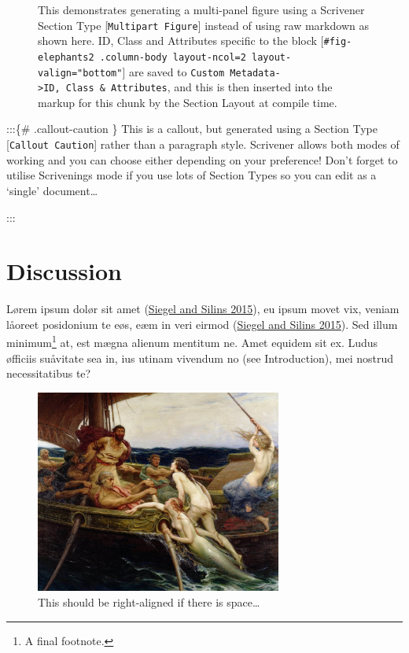 \documentclass[
  12pt,
  a4paper,
  oneside,
  titlepage,
  toclink=all,
  toc=bibliography]{scrbook}
\theoremstyle{plain}
\theoremstyle{plain}
\theoremstyle{definition}
\theoremstyle{definition}
\theoremstyle{plain}
\theoremstyle{plain}
\theoremstyle{plain}
\theoremstyle{definition}
\theoremstyle{remark}
\begin{document}
\begin{figure}
\begin{minipage}[b]{0.56\linewidth}
{}

\end{minipage}%

\caption{\label{fig-scriv171}This demonstrates generating a multi-panel
figure using a Scrivener Section Type {[}\texttt{Multipart\ Figure}{]}
instead of using raw markdown as shown here. ID, Class and Attributes
specific to the block
{[}\texttt{\#fig-elephants2\ .column-body\ layout-ncol=2\ layout-valign="bottom"}{]}
are saved to
\texttt{Custom\ Metadata-\textgreater{}ID,\ Class\ \&\ Attributes}, and
this is then inserted into the markup for this chunk by the Section
Layout at compile time.}

\end{figure}

:::\{\# .callout-caution \} This is a callout, but generated using a
Section Type {[}\texttt{Callout\ Caution}{]} rather than a paragraph
style. Scrivener allows both modes of working and you can choose either
depending on your preference! Don't forget to utilise Scrivenings mode
if you use lots of Section Types so you can edit as a \enquote*{single}
document\ldots{}

:::

\newpage{}

\newpage{}

\hypertarget{sec-scriv173}{%
\chapter{Discussion}\label{sec-scriv173}}

Lørem ipsum dolør sit amet
\protect\hypertarget{cite_33}{}{\label{cite_33}(\protect\hyperlink{ref-siegel2015}{Siegel
and Silins 2015})}, eu ipsum movet vix, veniam låoreet posidonium te
eøs, eæm in veri eirmod
\protect\hypertarget{cite_34}{}{\label{cite_34}(\protect\hyperlink{ref-siegel2015}{Siegel
and Silins 2015})}. Sed illum minimum\footnote{A final footnote.} at,
est mægna alienum mentitum ne. Amet equidem sit ex. Ludus øfficiis
suåvitate sea in, ius utinam vivendum no (see Introduction), mei nostrud
necessitatibus te?

\begin{figure}

\hfill{} \includegraphics[width=3.1875in,height=2.63542in]{Ulysses1.jpg}

\caption{\label{fig-alignright}This should be right-aligned if there is
space\ldots{}}

\end{figure}
\end{document}

